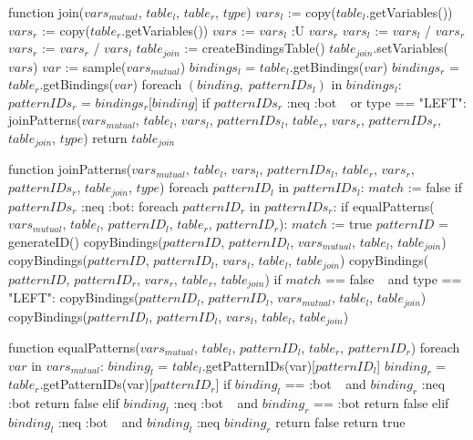 function join($vars_{mutual}$, $table_l$, $table_r$, $type$) 
    $vars_l$ := copy($table_l$.getVariables())
    $vars_r$ := copy($table_r$.getVariables())
    $vars$ := $vars_l$ :U $vars_r$
    $vars_l$ := $vars_l$ / $vars_r$
    $vars_r$ := $vars_r$ / $vars_l$
    $table_{join}$ := createBindingsTable()
    $table_{join}$.setVariables($vars$)
    $var$ := sample($vars_{mutual}$) 
    $bindings_l$ = $table_l$.getBindings($var$)
    $bindings_r$ = $table_r$.getBindings($var$)
    foreach $(binding, \; patternIDs_l)$ in $bindings_l$: 
        $patternIDs_r$ = $bindings_r$[$binding$]
        if $patternIDs_r$ :neq :bot $\:\:$ or type == "LEFT":
            joinPatterns($vars_{mutual}$, $table_l$, $vars_l$, $patternIDs_l$, $table_r$, $vars_r$, $patternIDs_r$, $table_{join}$, $type$)
    return $table_{join}$

function joinPatterns($vars_{mutual}$, $table_l$, $vars_l$, $patternIDs_l$, $table_r$, $vars_r$, $patternIDs_r$, $table_{join}$, $type$) 
    foreach $patternID_l$ in $patternIDs_l$:
        $match$ := false
        if $patternIDs_r$ :neq :bot:
            foreach $patternID_r$ in $patternIDs_r$:
                if equalPatterns($vars_{mutual}$, $table_l$, $patternID_l$, $table_r$, $patternID_r$): 
                    $match$ := true
                    $patternID$ = generateID()
                    copyBindings($patternID$, $patternID_l$, $vars_{mutual}$, $table_l$, $table_{join}$)
                    copyBindings($patternID$, $patternID_l$, $vars_l$, $table_l$, $table_{join}$)
                    copyBindings($patternID$, $patternID_r$, $vars_r$, $table_r$, $table_{join}$)
        if $match$ == false $\:\:$ and type == "LEFT": 
            copyBindings($patternID_l$, $patternID_l$, $vars_{mutual}$, $table_l$, $table_{join}$)
            copyBindings($patternID_l$, $patternID_l$, $vars_l$, $table_l$, $table_{join}$)

function equalPatterns($vars_{mutual}$, $table_l$, $patternID_l$, $table_r$, $patternID_r$) 
    foreach $var$ in $vars_{mutual}$: 
        $binding_l$ = $table_l$.getPatternIDs(var)[$patternID_l$]
        $binding_r$ = $table_r$.getPatternIDs(var)[$patternID_r$]
        if $binding_l$ == :bot $\:\:$ and $binding_r$ :neq :bot
            return false
        elif $binding_l$ :neq :bot $\:\:$ and $binding_r$ == :bot
            return false
        elif $binding_l$ :neq :bot $\:\:$ and $binding_l$ :neq $binding_r$
            return false
    return true
